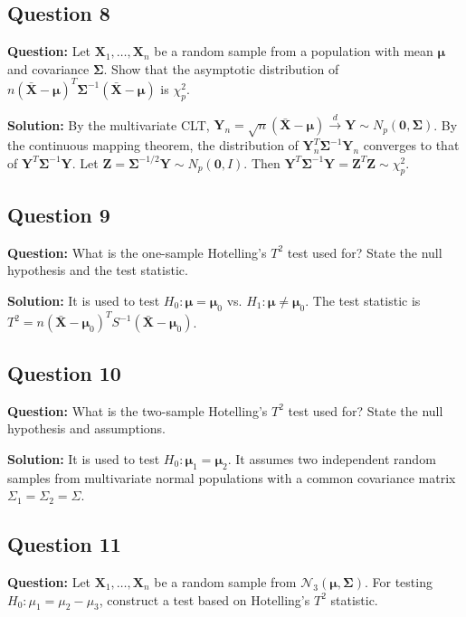 \subsection*{Question 8}
\textbf{Question:} Let $\mathbf{X}_1, \dots, \mathbf{X}_n$ be a random sample from a population with mean $\boldsymbol{\mu}$ and covariance $\boldsymbol{\Sigma}$. Show that the asymptotic distribution of $n(\bar{\mathbf{X}} - \boldsymbol{\mu})^T \boldsymbol{\Sigma}^{-1} (\bar{\mathbf{X}} - \boldsymbol{\mu})$ is $\chi^2_p$.

\textbf{Solution:}
By the multivariate CLT, $\mathbf{Y}_n = \sqrt{n}(\bar{\mathbf{X}} - \boldsymbol{\mu}) \xrightarrow{d} \mathbf{Y} \sim N_p(\mathbf{0}, \boldsymbol{\Sigma})$. By the continuous mapping theorem, the distribution of $\mathbf{Y}_n^T \boldsymbol{\Sigma}^{-1} \mathbf{Y}_n$ converges to that of $\mathbf{Y}^T \boldsymbol{\Sigma}^{-1} \mathbf{Y}$. Let $\mathbf{Z} = \boldsymbol{\Sigma}^{-1/2}\mathbf{Y} \sim N_p(\mathbf{0}, I)$. Then $\mathbf{Y}^T \boldsymbol{\Sigma}^{-1} \mathbf{Y} = \mathbf{Z}^T\mathbf{Z} \sim \chi^2_p$.

\subsection*{Question 9}
\textbf{Question:} What is the one-sample Hotelling's $T^2$ test used for? State the null hypothesis and the test statistic.

\textbf{Solution:}
It is used to test $H_0: \boldsymbol{\mu} = \boldsymbol{\mu}_0$ vs. $H_1: \boldsymbol{\mu} \neq \boldsymbol{\mu}_0$. The test statistic is $T^2 = n(\bar{\mathbf{X}} - \boldsymbol{\mu}_0)^T S^{-1} (\bar{\mathbf{X}} - \boldsymbol{\mu}_0)$.

\subsection*{Question 10}
\textbf{Question:} What is the two-sample Hotelling's $T^2$ test used for? State the null hypothesis and assumptions.

\textbf{Solution:}
It is used to test $H_0: \boldsymbol{\mu}_1 = \boldsymbol{\mu}_2$. It assumes two independent random samples from multivariate normal populations with a common covariance matrix $\Sigma_1 = \Sigma_2 = \Sigma$.

\subsection*{Question 11}
\textbf{Question:} Let $\mathbf{X}_1, \dots, \mathbf{X}_n$ be a random sample from $\mathcal{N}_3(\boldsymbol{\mu}, \boldsymbol{\Sigma})$. For testing $H_0: \mu_1 = \mu_2 - \mu_3$, construct a test based on Hotelling's $T^2$ statistic.

